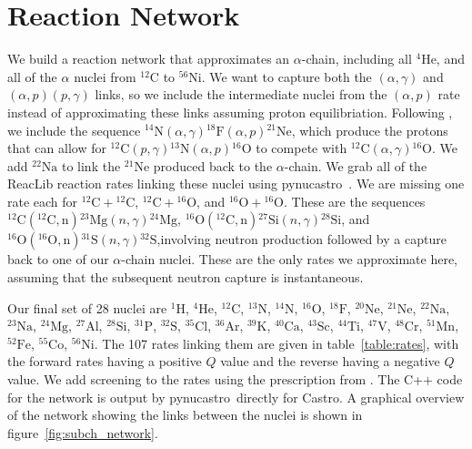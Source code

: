 \documentclass[times,preprint]{aastex631}
\newcommand{\castro}{{\sf Castro}}
\newcommand{\pynucastro}{{\sf pynucastro}}
\newcommand{\isotm}[2]{{}^{#2}\mathrm{#1}}
\begin{document}
\section{Reaction Network}
\label{sec:app:reactionnet}
We build a reaction network that approximates an $\alpha$-chain,
including all $\isotm{He}{4}$, and all of the $\alpha$ nuclei from
$\isotm{C}{12}$ to $\isotm{Ni}{56}$.  We want to capture both the
$(\alpha,\gamma)$ and $(\alpha,p)(p,\gamma)$ links, so we include the
intermediate nuclei from the $(\alpha,p)$ rate instead of
approximating these links assuming proton equilibriation.  Following
\citet{shenbildsten}, we include the sequence
$\isotm{N}{14}(\alpha,\gamma)\isotm{F}{18}(\alpha, p)\isotm{Ne}{21}$,
which produce the protons that can allow for $\isotm{C}{12}(p,
\gamma)\isotm{N}{13}(\alpha, p)\isotm{O}{16}$ to compete with
$\isotm{C}{12}(\alpha,\gamma)\isotm{O}{16}$.  We add $\isotm{Na}{22}$
to link the $\isotm{Ne}{21}$ produced back to the $\alpha$-chain.  We
grab all of the ReacLib \citep{reaclib} reaction rates linking these
nuclei using \pynucastro~\citep{pynucastro}.  We are missing one rate
each for $\isotm{C}{12} + \isotm{C}{12}$, $\isotm{C}{12} +
\isotm{O}{16}$, and $\isotm{O}{16} + \isotm{O}{16}$.  These are
the sequences $\isotm{C}{12}(\isotm{C}{12}, \mathrm{n})\isotm{Mg}{23}(n, \gamma)\isotm{Mg}{24}$,
$\isotm{O}{16}(\isotm{C}{12}, \mathrm{n})\isotm{Si}{27}(n, \gamma)\isotm{Si}{28}$, and
$\isotm{O}{16}(\isotm{O}{16}, \mathrm{n})\isotm{S}{31}(n, \gamma)\isotm{S}{32}$,involving neutron
production followed by a capture back to one of our $\alpha$-chain
nuclei.  These are the only rates we approximate here, assuming
that the subsequent neutron capture is instantaneous.

Our final set of 28 nuclei are ${}^{1}\mathrm{H}$, ${}^{4}\mathrm{He}$,
${}^{12}\mathrm{C}$, ${}^{13}\mathrm{N}$, ${}^{14}\mathrm{N}$,
${}^{16}\mathrm{O}$, ${}^{18}\mathrm{F}$, ${}^{20}\mathrm{Ne}$,
${}^{21}\mathrm{Ne}$, ${}^{22}\mathrm{Na}$, ${}^{23}\mathrm{Na}$,
${}^{24}\mathrm{Mg}$, ${}^{27}\mathrm{Al}$, ${}^{28}\mathrm{Si}$,
${}^{31}\mathrm{P}$, ${}^{32}\mathrm{S}$, ${}^{35}\mathrm{Cl}$,
${}^{36}\mathrm{Ar}$, ${}^{39}\mathrm{K}$, ${}^{40}\mathrm{Ca}$,
${}^{43}\mathrm{Sc}$, ${}^{44}\mathrm{Ti}$, ${}^{47}\mathrm{V}$,
${}^{48}\mathrm{Cr}$, ${}^{51}\mathrm{Mn}$, ${}^{52}\mathrm{Fe}$,
${}^{55}\mathrm{Co}$, ${}^{56}\mathrm{Ni}$.  The 107 rates linking them are
given in table~\ref{table:rates}, with the forward rates having a positive $Q$
value and the reverse having a negative $Q$ value.  We add screening to the
rates using the prescription from \citet{graboske:1973,alastuey:1978,itoh:1979}.
The C++ code for the network is output by \pynucastro\ directly for \castro.  A
graphical overview of the network showing the links between the nuclei is shown
in figure~\ref{fig:subch_network}.
\end{document}
